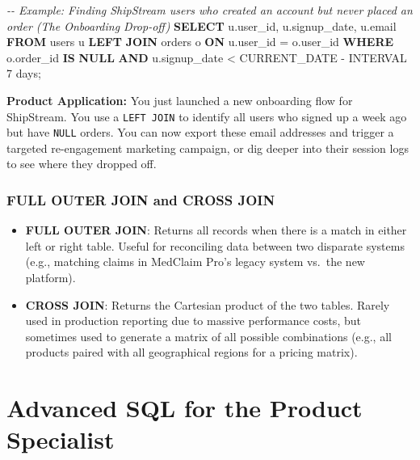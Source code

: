 \documentclass[
  11pt,
  openany,
  oneside]{book}
\newenvironment{Shaded}{}{}
\newcommand{\CommentTok}[1]{\textcolor[rgb]{0.38,0.63,0.69}{\textit{#1}}}
\newcommand{\DataTypeTok}[1]{\textcolor[rgb]{0.56,0.13,0.00}{#1}}
\newcommand{\FunctionTok}[1]{\textcolor[rgb]{0.02,0.16,0.49}{#1}}
\newcommand{\KeywordTok}[1]{\textcolor[rgb]{0.00,0.44,0.13}{\textbf{#1}}}
\newcommand{\NormalTok}[1]{#1}
\newcommand{\OperatorTok}[1]{\textcolor[rgb]{0.40,0.40,0.40}{#1}}
\newcommand{\StringTok}[1]{\textcolor[rgb]{0.25,0.44,0.63}{#1}}
\providecommand{\tightlist}{%
  \setlength{\itemsep}{0pt}\setlength{\parskip}{0pt}}
\begin{document}
\begin{Shaded}
\begin{Highlighting}[]
\CommentTok{{-}{-} Example: Finding ShipStream users who created an account but never placed an order (The Onboarding Drop{-}off)}
\KeywordTok{SELECT} 
\NormalTok{    u.user\_id, }
\NormalTok{    u.signup\_date, }
\NormalTok{    u.email}
\KeywordTok{FROM}\NormalTok{ users u}
\KeywordTok{LEFT} \KeywordTok{JOIN}\NormalTok{ orders o }\KeywordTok{ON}\NormalTok{ u.user\_id }\OperatorTok{=}\NormalTok{ o.user\_id}
\KeywordTok{WHERE}\NormalTok{ o.order\_id }\KeywordTok{IS} \KeywordTok{NULL} 
  \KeywordTok{AND}\NormalTok{ u.signup\_date }\OperatorTok{\textless{}} \FunctionTok{CURRENT\_DATE} \OperatorTok{{-}} \DataTypeTok{INTERVAL} \StringTok{\textquotesingle{}7 days\textquotesingle{}}\NormalTok{;}
\end{Highlighting}
\end{Shaded}

\textbf{Product Application:} You just launched a new onboarding flow
for ShipStream. You use a \texttt{LEFT\ JOIN} to identify all users who
signed up a week ago but have \texttt{NULL} orders. You can now export
these email addresses and trigger a targeted re-engagement marketing
campaign, or dig deeper into their session logs to see where they
dropped off.

\subsubsection{FULL OUTER JOIN and CROSS
JOIN}\label{full-outer-join-and-cross-join}

\begin{itemize}
\tightlist
\item
  \textbf{FULL OUTER JOIN}: Returns all records when there is a match in
  either left or right table. Useful for reconciling data between two
  disparate systems (e.g., matching claims in MedClaim Pro's legacy
  system vs.~the new platform).
\item
  \textbf{CROSS JOIN}: Returns the Cartesian product of the two tables.
  Rarely used in production reporting due to massive performance costs,
  but sometimes used to generate a matrix of all possible combinations
  (e.g., all products paired with all geographical regions for a pricing
  matrix).
\end{itemize}

\bigskip

\section{Advanced SQL for the Product
Specialist}\label{advanced-sql-for-the-product-specialist}
\end{document}
